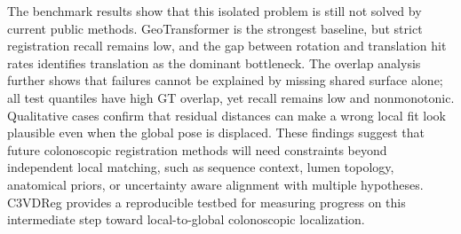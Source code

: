 \documentclass{bmvc2k}
\begin{document}
The benchmark results show that this isolated problem is still not solved by current public methods. GeoTransformer is the strongest baseline, but strict registration recall remains low, and the gap between rotation and translation hit rates identifies translation as the dominant bottleneck. The overlap analysis further shows that failures cannot be explained by missing shared surface alone; all test quantiles have high GT overlap, yet recall remains low and nonmonotonic. Qualitative cases confirm that residual distances can make a wrong local fit look plausible even when the global pose is displaced. These findings suggest that future colonoscopic registration methods will need constraints beyond independent local matching, such as sequence context, lumen topology, anatomical priors, or uncertainty aware alignment with multiple hypotheses. C3VDReg provides a reproducible testbed for measuring progress on this intermediate step toward local-to-global colonoscopic localization.

\clearpage

\end{document}
